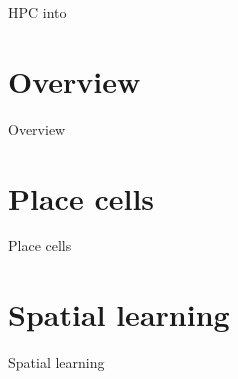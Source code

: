 HPC into

\section{Overview}
Overview

\section{Place cells}
Place cells

\section{Spatial learning}
Spatial learning